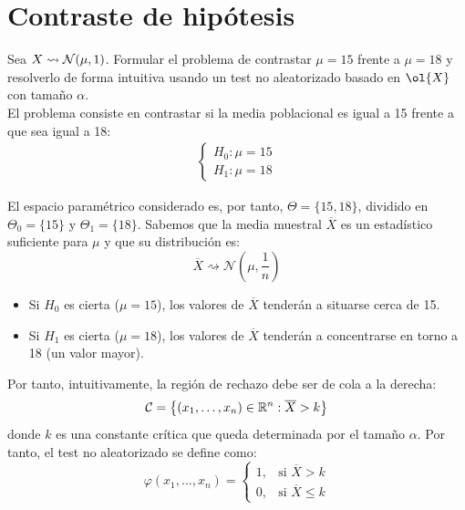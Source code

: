 \section{Contraste de hipótesis}

\begin{ejemplo}
    Sea $X\rightsquigarrow \mathcal{N}(\mu,1)$. Formular el problema de contrastar $\mu=15$ frente a $\mu=18$ y resolverlo de forma intuitiva usando un test no aleatorizado basado en $\ol{X}$ con tamaño $\alpha$.\\

    El problema consiste en contrastar si la media poblacional es igual a 15 frente a que sea igual a 18:
    \begin{align*}
        \begin{cases}
        H_0: \mu = 15 \\
        H_1: \mu = 18
        \end{cases}
    \end{align*}
    
    El espacio paramétrico considerado es, por tanto, $\Theta = \{15, 18\}$, dividido en $\Theta_0 = \{15\}$ y $\Theta_1 = \{18\}$. Sabemos que la media muestral $\overline{X}$ es un estadístico suficiente para $\mu$ y que su distribución es:
    \[
    \overline{X} \rightsquigarrow \mathcal{N}\left(\mu, \frac{1}{n}\right)
    \]
    \begin{itemize}
        \item Si $H_0$ es cierta ($\mu = 15$), los valores de $\overline{X}$ tenderán a situarse cerca de 15.
        \item Si $H_1$ es cierta ($\mu = 18$), los valores de $\overline{X}$ tenderán a concentrarse en torno a 18 (un valor mayor).
    \end{itemize}

    Por tanto, intuitivamente, la región de rechazo debe ser de cola a la derecha:
    \begin{equation*}
        \mathcal{C} = \left\{(x_1, \dots, x_n) \in \mathbb{R}^n : \overline{X} > k\right\}
    \end{equation*}
    donde $k$ es una constante crítica que queda determinada por el tamaño $\alpha$. Por tanto, el test no aleatorizado se define como:
    \begin{equation*}
        \varphi(x_1, \dots, x_n) =
        \begin{cases}
        1, & \text{si } \overline{X} > k \\
        0, & \text{si } \overline{X} \leq k
        \end{cases}
    \end{equation*}
    

\end{ejemplo}
